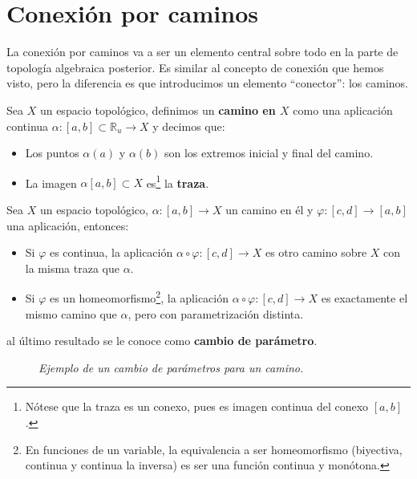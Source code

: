 \chapter{Conexión por caminos}%
\label{cha:conexion_por_caminos}
La conexión por caminos va a ser un elemento central sobre todo en la parte de topología algebraica posterior. Es similar al concepto de conexión que hemos visto, pero la diferencia es que introducimos un elemento ``conector'': los caminos.

\begin{defi}[Camino]
Sea $X$ un espacio topológico, definimos un \textbf{camino en $X$} como una aplicación continua $\alpha: \left[ a, b \right] \subset \mathbb{R}_u \rightarrow X$ y decimos que:
\begin{itemize}
    \item Los puntos $\alpha\left( a \right)$ y $\alpha\left( b \right)$ son los extremos inicial y final del camino.
    \item La imagen $\alpha\left[ a, b \right] \subset X$ es\footnote{Nótese que la traza es un conexo, pues es imagen continua del conexo $[a,b]$.} la \textbf{traza}.
\end{itemize}
\end{defi}

\begin{prop}
Sea $X$ un espacio topológico, $\alpha :[a,b] \rightarrow X$ un camino en él y $\varphi
 : [c,d]\rightarrow [a,b]$ una aplicación, entonces:
\begin{itemize}
\item Si $\varphi$ es continua, la aplicación $\alpha \circ \varphi :[c,d]\rightarrow X$ es otro camino sobre $X$ con la misma traza que $\alpha$.
\item Si $\varphi$ es un homeomorfismo\footnote{En funciones de un variable, la equivalencia a ser homeomorfismo (biyectiva, continua y continua la inversa) es ser una función continua y monótona.}, la aplicación $\alpha \circ \varphi:[c,d]\rightarrow X$ es exactamente el mismo camino que $\alpha$, pero con parametrización distinta.
\end{itemize}
al último resultado se le conoce como \textbf{cambio de parámetro}.
\begin{figure}[H]
    \centering
    \caption{\textit{Ejemplo de un cambio de parámetros para un camino.}}
    \label{fig:cambio-de-caminos}
\end{figure} 
\end{prop}

